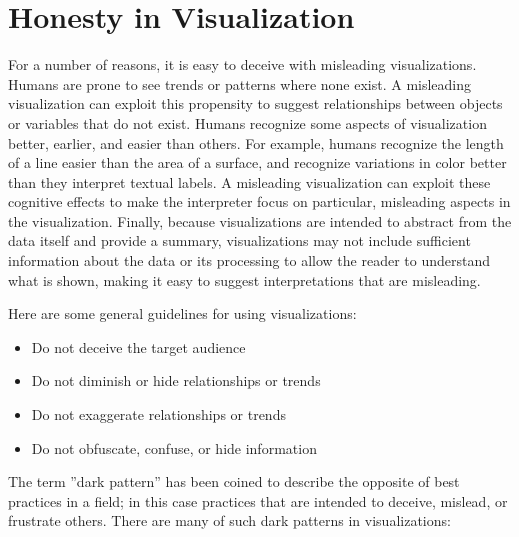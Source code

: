 \section{Honesty in Visualization}

For a number of reasons, it is easy to deceive with misleading visualizations. Humans are prone to see trends or patterns where none exist. A misleading visualization can exploit this propensity to suggest relationships between objects or variables that do not exist. Humans recognize some aspects of visualization better, earlier, and easier than others. For example, humans recognize the length of a line easier than the area of a surface, and recognize variations in color better than they interpret textual labels. A misleading visualization can exploit these cognitive effects to make the interpreter focus on particular, misleading aspects in the visualization. Finally, because visualizations are intended to abstract from the data itself and provide a summary, visualizations may not include sufficient information about the data or its processing to allow the reader to understand what is shown, making it easy to suggest interpretations that are misleading.

Here are some general guidelines for using visualizations:
\begin{itemize}
   \item Do not deceive the target audience
   \item Do not diminish or hide relationships or trends
   \item Do not exaggerate relationships or trends
   \item Do not obfuscate, confuse, or hide information
\end{itemize}

The term ''dark pattern'' has been coined to describe the opposite of best practices in a field; in this case practices that are intended to deceive, mislead, or frustrate others. There are many of such dark patterns in visualizations:

